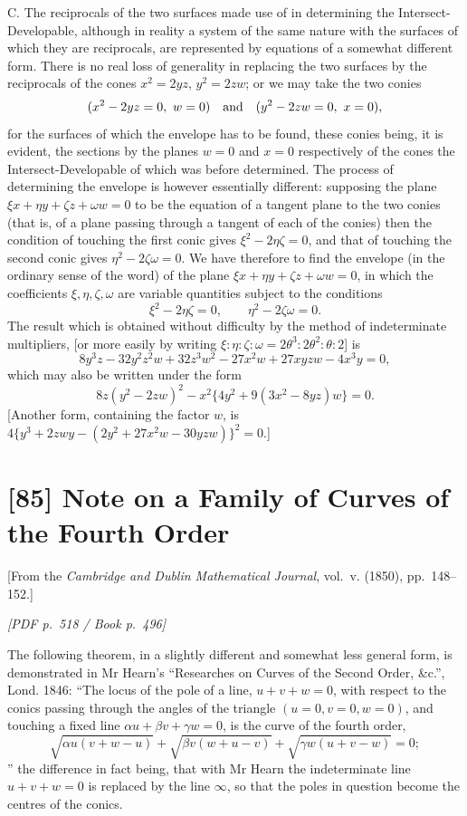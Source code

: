 \documentclass[11pt]{article}
\newcommand{\Page}[2]{\bigskip\noindent\textit{[PDF p.~#1 / Book p.~#2]}\par\smallskip}
\begin{document}
C. The reciprocals of the two surfaces made use of in determining the
Intersect-Developable, although in reality a system of the same nature with the
surfaces of which they are reciprocals, are represented by equations of a somewhat
different form. There is no real loss of generality in replacing the two surfaces by
the reciprocals of the cones $x^2=2yz$, $y^2=2zw$; or we may take the two conies
\[
        (x^2-2yz=0,\ w=0)\quad\hbox{and}\quad (y^2-2zw=0,\ x=0),
\]
for the surfaces of which the envelope has to be found, these conies being, it is
evident, the sections by the planes $w=0$ and $x=0$ respectively of the cones the
Intersect-Developable of which was before determined. The process of determining
the envelope is however essentially different: supposing the plane
$\xi x+\eta y+\zeta z+\omega w=0$ to be the equation of a tangent plane to the
two conies (that is, of a plane passing through a tangent of each of the conies) then
the condition of touching the first conic gives $\xi^2-2\eta\zeta=0$, and that of
touching the second conic gives $\eta^2-2\zeta\omega=0$. We have therefore to find
the envelope (in the ordinary sense of the word) of the plane
$\xi x+\eta y+\zeta z+\omega w=0$, in which the coefficients
$\xi,\eta,\zeta,\omega$ are variable quantities subject to the conditions
\[
        \xi^2-2\eta\zeta=0,\qquad \eta^2-2\zeta\omega=0.
\]
The result which is obtained without difficulty by the method of indeterminate
multipliers, [or more easily by writing
$\xi:\eta:\zeta:\omega=2\theta^3:2\theta^2:\theta:2$] is
\[
        8y^3z-32y^2z^2w+32z^3w^2-27x^2w+27xyzw-4x^3y=0,
\]
which may also be written under the form
\[
        8z(y^2-2zw)^2-x^2\{4y^2+9(3x^2-8yz)w\}=0.
\]
[Another form, containing the factor $w$, is
$4\{y^3+2zwy-(2y^2+27x^2w-30yzw)\}^2=0$.]

\section*{[85] Note on a Family of Curves of the Fourth Order}

\begin{center}
[From the \textit{Cambridge and Dublin Mathematical Journal}, vol.~v. (1850),
pp.~148--152.]
\end{center}

\Page{518}{496}

The following theorem, in a slightly different and somewhat less general form, is
demonstrated in Mr Hearn's ``Researches on Curves of the Second Order, \&c.'',
Lond. 1846:
``The locus of the pole of a line, $u+v+w=0$, with respect to the conics passing
through the angles of the triangle $(u=0,v=0,w=0)$, and touching a fixed line
$\alpha u+\beta v+\gamma w=0$, is the curve of the fourth order,
\[
 \sqrt{\alpha u(v+w-u)}+\sqrt{\beta v(w+u-v)}+\sqrt{\gamma w(u+v-w)}=0;
\]
'' the difference in fact being, that with Mr Hearn the indeterminate line
$u+v+w=0$ is replaced by the line $\infty$, so that the poles in question become the
centres of the conics.
\end{document}
